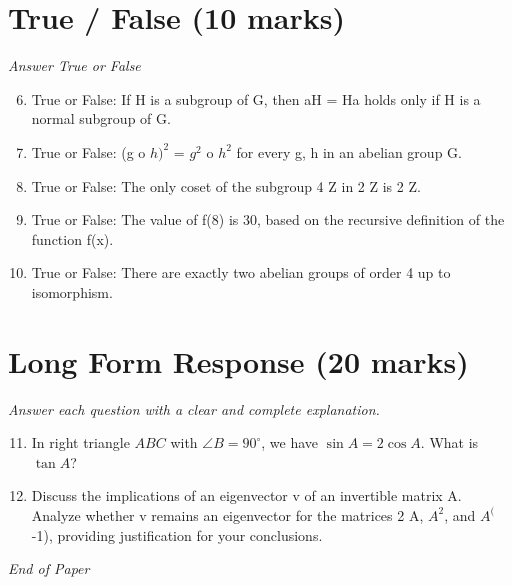 \documentclass[12pt]{article}
\begin{document}
\section*{True / False (10 marks)}
\textit{Answer True or False}
\begin{enumerate}[label=\arabic*.]
\setcounter{enumi}{5}
\item True or False: If H is a subgroup of G, then aH = Ha holds only if H is a normal subgroup of G.
\item True or False: (g o $h)^2$ = $g^2$ o $h^2$ for every g, h in an abelian group G.
\item True or False: The only coset of the subgroup 4 Z in 2 Z is 2 Z.
\item True or False: The value of f(8) is 30, based on the recursive definition of the function f(x).
\item True or False: There are exactly two abelian groups of order 4 up to isomorphism.
\end{enumerate}

\section*{Long Form Response (20 marks)}
\textit{Answer each question with a clear and complete explanation.}
\begin{enumerate}[label=\arabic*.]
\setcounter{enumi}{10}
\item In right triangle $ABC$ with $\angle B = 90^\circ$, we have $\sin A = 2\cos A$. What is $\tan A$?
\item Discuss the implications of an eigenvector v of an invertible matrix A. Analyze whether v remains an eigenvector for the matrices 2 A, $A^2$, and $A^($-1), providing justification for your conclusions.
\end{enumerate}

\vfill
\noindent\textit{End of Paper}
\end{document}
